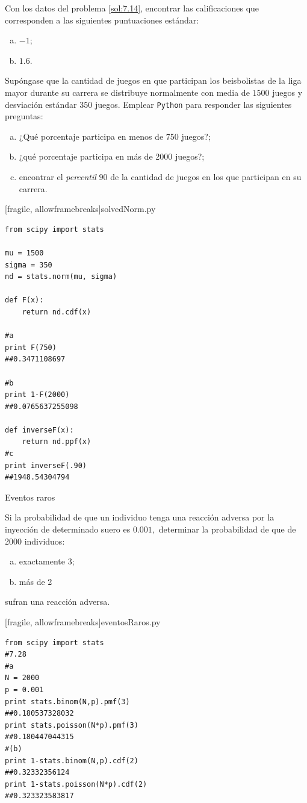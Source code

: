  \begin{ejemplo}
  \label{sol:7.15}
  Con los datos del problema \ref{sol:7.14}, encontrar las calificaciones que corresponden a las siguientes puntuaciones estándar:
  \begin{enumerate}[(a)]
   \item $-1$;
   \item $1.6$.
  \end{enumerate}

 \end{ejemplo}



 \begin{ejemplo}
  \label{sol:7.16}
  Supóngase que la cantidad de juegos en que participan los beisbolistas de la liga mayor durante su carrera se distribuye normalmente con media de $1500$ juegos y desviación estándar $350$ juegos. Emplear \texttt{Python} para responder las siguientes preguntas:
  \begin{enumerate}[(a)]
   \item ¿Qué porcentaje participa en menos de 750 juegos?;
   \item ¿qué porcentaje participa en más de 2000 juegos?;
   \item encontrar el \emph{percentil} $90$ de la cantidad de juegos en los que participan en su carrera.
  \end{enumerate}

 \end{ejemplo}


[fragile, allowframebreaks]{solvedNorm.py}
 \begin{verbatim}
from scipy import stats

mu = 1500
sigma = 350
nd = stats.norm(mu, sigma)

def F(x):
    return nd.cdf(x)

#a
print F(750)
##0.3471108697

#b
print 1-F(2000)
##0.0765637255098

def inverseF(x):
    return nd.ppf(x)
#c
print inverseF(.90)
##1948.54304794
 \end{verbatim}


{Eventos raros}
\begin{ejemplo}
\label{sol:7.28}
  Si la probabilidad de que un individuo tenga una reacción adversa por la inyección de determinado suero es $0.001,$ determinar la probabilidad de que de 2000 individuos:
 \begin{enumerate}[(a)]
  \item exactamente 3;
  \item más de 2
 \end{enumerate}
sufran una reacción adversa.
\end{ejemplo}


[fragile, allowframebreaks]{eventosRaros.py}
 \begin{verbatim}
from scipy import stats
#7.28
#a
N = 2000
p = 0.001
print stats.binom(N,p).pmf(3)
##0.180537328032
print stats.poisson(N*p).pmf(3)
##0.180447044315
#(b)
print 1-stats.binom(N,p).cdf(2)
##0.32332356124
print 1-stats.poisson(N*p).cdf(2)
##0.323323583817
 \end{verbatim}




